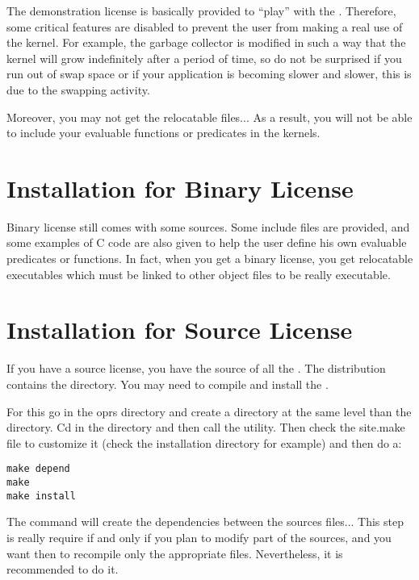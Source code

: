 The demonstration license is basically provided to ``play'' with the
\COPRSDE{}. Therefore, some critical features are disabled to
prevent the user from making a real use of the kernel. For example, the garbage
collector is modified in such a way that the kernel will grow indefinitely
after a period of time, so do not be surprised if you run out of swap space or
if your application is becoming slower and slower, this is due to the swapping
activity.

Moreover, you may not get the relocatable files... As a result, you will
not be able to include your evaluable functions or predicates in the
kernels.

\section{Installation for Binary License}

Binary license still comes with some sources. Some include files are
provided, and some examples of C code are also given to help the user
define his own evaluable predicates or functions. In fact, when you get a
binary license, you get relocatable executables which must be linked to
other object files to be really executable.

\section{Installation for Source License}

If you have a source license, you have the source of all the \COPRSDE{}.
The distribution contains the  directory.
You may need to compile and install the \COPRSDE{}.

For this go in the oprs directory and create a  directory at the
same level than the   directory. Cd in the  directory and
then call the  utility. Then check the site.make file
to customize it (check the installation directory for example) and then do a:

\begin{verbatim}
make depend
make
make install
\end{verbatim}

The  command will create the dependencies between the
sources files... This step is really require if and only if you plan to
modify part of the sources, and you want then to recompile only the
appropriate files. Nevertheless, it is recommended to do it.

